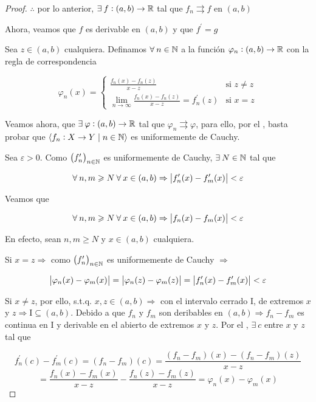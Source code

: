 \begin{proof}
    $\therefore$ por lo anterior, $\exists \: f : (a,b) \to \mathbb{R}$ tal que $f_n \rightrightarrows f$ en $(a,b)$

    Ahora, veamos que $f$ es derivable en $(a,b)$ y que ${f}^{\prime} = g$

    Sea $z \in (a,b)$ cualquiera. Definamos $\forall \: n \in \mathbb{N}$ a la función ${\varphi}_{n} : (a,b) \to \mathbb{R}$ con la regla de correspondencia
    
    $$ {\varphi}_{n}(x) = \begin{cases}
            \frac{f_n(x)-f_n(z)}{x-z} & \text{si }  z \neq z\\
              \lim\limits_{n \to \infty} \frac{f_n(x)-f_n(z)}{x-z}= {f}^{\prime}_{n}(z) & \text{si } x = z
     \end{cases}$$

     Veamos ahora, que $\exists \: \varphi : (a,b) \to \mathbb{R}$ tal que ${\varphi}_{n} \rightrightarrows \varphi$, para ello, por el , basta probar que $\langle f_n : X \to Y \mid n \in \mathbb{N} \rangle $ es uniformemente de Cauchy.

     Sea $\varepsilon > 0$. Como ${\left({f}^{\prime}_{n}\right)}_{n \in \mathbb{N}}$ es uniformemente de Cauchy, $\exists \: N \in \mathbb{N}$ tal que

     $$\forall \: n,m \geqslant N \: \forall \: x \in (a,b) \Rightarrow \abs{{f}^{\prime}_{n}(x)-{f}^{\prime}_{m}(x)} < \varepsilon$$

     Veamos que

     $$\forall \: n,m \geqslant N \: \forall \: x \in (a,b) \Rightarrow \abs{{f}_{n}(x)-{f}_{m}(x)} < \varepsilon$$

     En efecto, sean $n,m \geqslant N$ y $x \in (a,b)$ cualquiera.

     Si $x = z \Rightarrow$ como ${\left({f}^{\prime}_{n}\right)}_{n \in \mathbb{N}}$ es uniformemente de Cauchy $\Rightarrow$

     $$\abs{{\varphi}_{n}(x)-{\varphi}_{m}(x)} = \abs{{\varphi}_{n}(z)-{\varphi}_{m}(z)} = \abs{{f}^{\prime}_{n}(x)-{f}^{\prime}_{m}(x)} < \varepsilon$$

     Si $x \neq z$, por ello, s.t.q. $x, z \in (a,b) \Rightarrow$ con el intervalo cerrado $\mathrm{I}$, de extremos $x$ y $z \Rightarrow \mathrm{I} \subseteq (a,b)$. Debido a que $f_n$ y $f_m$ son deribables en $(a,b) \Rightarrow f_n - f_m$ es continua en $\mathrm{I}$ y derivable en el abierto de extremos $x$ y $z$. Por el , $\exists \: c$ entre $x$ y $z$ tal que

     $$ {f}^{\prime}_{n}(c)-{f}^{\prime}_{m}(c) = (f_n-f_m)(c) = \frac{(f_n-f_m)(x)-(f_n-f_m)(z)}{x-z} $$
     $$=  \frac{f_n(x)-f_m(x)}{x-z}- \frac{f_n(z)-f_m(z)}{x-z} = {\varphi}_{n}(x) - {\varphi}_{m}(x)$$


\end{proof}
